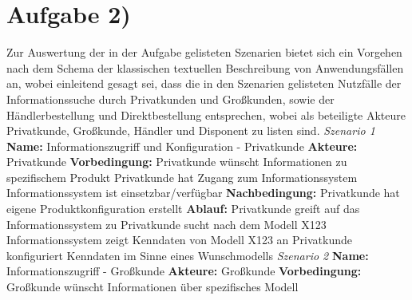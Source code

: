 \documentclass{swp1}
\begin{document}
\section*{Aufgabe 2)}

Zur Auswertung der in der Aufgabe gelisteten Szenarien bietet sich ein Vorgehen nach dem Schema der klassischen textuellen Beschreibung von Anwendungsfällen an, wobei einleitend gesagt sei, dass die in den Szenarien gelisteten Nutzfälle der Informationssuche durch Privatkunden und Großkunden, sowie der Händlerbestellung und Direktbestellung entsprechen, wobei als beteiligte Akteure Privatkunde, Großkunde, Händler und Disponent zu listen sind.\newline
\newline
\emph{Szenario 1}\newline
\textbf{Name:}\newline
Informationszugriff und Konfiguration - Privatkunde\newline
\textbf{Akteure:}\newline
Privatkunde\newline
\textbf{Vorbedingung:}\newline
Privatkunde wünscht Informationen zu spezifischem Produkt\newline
Privatkunde hat Zugang zum Informationssystem\newline
Informationssystem ist einsetzbar/verfügbar\newline
\textbf{Nachbedingung:}\newline
Privatkunde hat eigene Produktkonfiguration erstellt\newline
\textbf{Ablauf:}\newline
Privatkunde greift auf das Informationssystem zu\newline
Privatkunde sucht nach dem Modell X123\newline
Informationssystem zeigt Kenndaten von Modell X123 an\newline
Privatkunde konfiguriert Kenndaten im Sinne eines Wunschmodells\newline
\newline
\emph{Szenario 2}\newline
\textbf{Name:}\newline
Informationszugriff - Großkunde\newline
\textbf{Akteure:}\newline
Großkunde\newline
\textbf{Vorbedingung:}\newline
Großkunde wünscht Informationen über spezifisches Modell\newline
\end{document}

